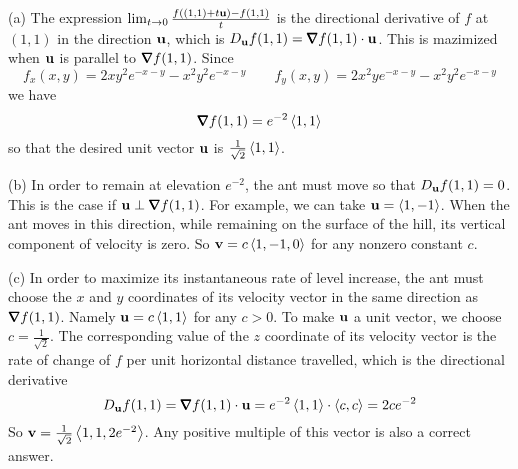 \begin{solution}
(a) The expression
$
\lim_{t\rightarrow 0}\frac{f((1,1)+t\mathbf{u})-f(1,1)}{t}
$
is the directional derivative of $f$ at $(1,1)$ in the direction $\mathbf{u}$,
which is $D_\vu f(1,1)=\vnabla f(1,1)\cdot\vu$. This is mazimized when $\mathbf{u}$ is
parallel to  $\vnabla f(1,1)$. Since
\begin{equation*}
f_x(x,y)=2xy^2e^{-x-y}-x^2y^2e^{-x-y}\qquad
f_y(x,y)=2x^2ye^{-x-y}-x^2y^2e^{-x-y}
\end{equation*}
we have
\begin{equation*}
\vnabla f(1,1)=e^{-2}\llt 1,1\rgt
\end{equation*}
so that the desired unit vector $\mathbf{u}$ is $\frac{1}{\sqrt{2}}\left< 1,1\right>$.

(b) In order to remain at elevation $e^{-2}$, the ant must move so
that $D_{\mathbf{u}} f(1,1)=0$. This is the case if $\vu\perp\vnabla f(1,1)$.
For example, we can take $\mathbf{u}=\left< 1,-1\right>$. When the ant moves 
in this direction, while remaining on the surface of the hill, its 
vertical component of velocity is zero. So $\mathbf{v}=c\left< 1,-1,0\right>$ for any 
nonzero constant $c$.

(c) In order to maximize its instantaneous rate of level increase,
the ant must choose the $x$ and $y$ coordinates of its velocity vector
in the same direction as  $\vnabla f(1,1)$. Namely $\mathbf{u}=c\left< 1,1\right>$ for any
$c>0$. To make $\mathbf{u}$ a unit vector, we choose $c=\frac{1}{\sqrt{2}}$.
The corresponding value of the $z$ coordinate of its velocity vector is
the rate of change of $f$ per unit horizontal distance travelled, which
is the directional derivative 
\begin{equation*}
D_\vu f(1,1)=\vnabla f(1,1)\cdot\vu=e^{-2}\llt 1,1\rgt \cdot\llt c,c\rgt
=2ce^{-2}
\end{equation*}
 So $\mathbf{v}=\frac{1}{\sqrt{2}}\left< 1,1,2e^{-2}\right>$. Any positive multiple
of this vector is also a correct answer.
\end{solution}

